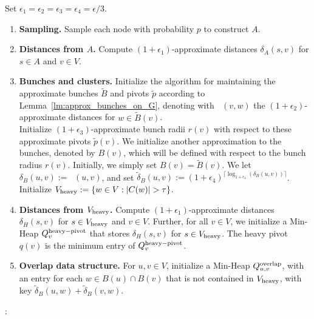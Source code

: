 \documentclass[11pt]{article}
\theoremstyle{definition}
\theoremstyle{remark}
\DeclareMathOperator{\dLNbunch}{\delta_{\tilde{B}}}
\begin{document}
Set $\epsilon_1=\epsilon_2=\epsilon_3=\epsilon_4=\epsilon/3$.
\begin{enumerate}
    \item \textbf{Sampling.} Sample each node with probability $p$ to construct $A$. \label{step:sampling_moved}
    \item \textbf{Distances from $A$.} Compute $(1+\epsilon_1)$-approximate distances $\delta_A(s,v)$ for $s\in A$ and $v\in V$. 
    \item \textbf{Bunches and clusters.} Initialize the algorithm for maintaining the approximate bunches $\tilde B$ and pivots $\tilde p$ according to Lemma~\ref{lm:approx_bunches_on_G}, denoting with $\dLNbunch(v,w)$ the $(1+\epsilon_2)$-approximate distances for $w\in \tilde B(v)$.\\
    Initialize $(1+\epsilon_3)$-approximate bunch radii $r(v)$ with respect to these approximate pivots $\tilde p(v)$.  \label{step:A_MSSP_moved}
    We initialize another approximation to the bunches, denoted by $B(v)$, which will be defined with respect to the bunch radius $r(v)$. Initially, we simply set $B(v)=\tilde{B}(v)$. We let $\delta_B(u,v):=\dLNbunch(u,v)$, and set $\tilde \delta_B(u,v) := (1+\epsilon_4)^{\lceil \log_{1+\epsilon_4}(\delta_B(u,v))\rceil}$. Initialize $V_{\rm{heavy}}:= \{w\in V : |C(w)|>\tau\}$. \label{step:bunches_moved}
    \item \textbf{Distances from $V_{\rm{heavy}}$.} Compute $(1+\epsilon_1)$-approximate distances $\delta_H(s,v)$ for $s\in V_{\rm{heavy}}$ and $v\in V$. Further, for all $v\in V$, we initialize a Min-Heap $Q^{\rm{heavy-pivot}}_v$ that stores $\delta_H(s,v)$ for $s\in V_{\rm{heavy}}$. The heavy pivot $q(v)$ is the minimum entry of $Q^{\rm{heavy-pivot}}_v$. \label{step:H_MSSP_moved}
    \item \textbf{Overlap data structure.} For $u,v\in V$, initialize a Min-Heap $Q^{\rm{overlap}}_{u,v}$, with an entry for each $w\in B(u)\cap B(v)$ that is not contained in $V_{\rm{heavy}}$, with key $\tilde \delta_B(u,w)+\tilde \delta_B(v,w)$.
\end{enumerate}

\noindent{}:\\
\indent {}\\
\end{document}
